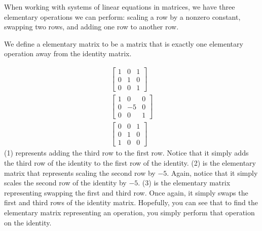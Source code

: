 When working with systems of linear equations in matrices, we have three elementary operations we can perform: scaling a row by a nonzero constant, swapping two rows, and adding one row to another row.
\begin{definition}
    We define a elementary matrix to be a matrix that is exactly one elementary operation away from the identity matrix.
\end{definition}
\begin{example}
    \begin{align*}
        \begin{bmatrix}
            1 & 0 & 1 \\
            0 & 1 & 0 \\
            0 & 0 & 1
        \end{bmatrix}\tag{1}\\
        \begin{bmatrix}
            1 & 0 & 0 \\
            0 & -5 & 0 \\
            0 & 0 & 1
        \end{bmatrix}\tag{2}\\
        \begin{bmatrix}
            0 & 0 & 1\\
            0 & 1 & 0\\
            1 & 0 & 0
        \end{bmatrix}\tag{3}
    \end{align*}
    (1) represents adding the third row to the first row. Notice that it simply adds the third row of the identity to the first row of the identity. (2) is the elementary matrix that represents scaling the second row by $-5$. Again, notice that it simply scales the second row of the identity by $-5$. (3) is the elementary matrix representing swapping the first and third row. Once again, it simply swaps the first and third rows of the identity matrix. Hopefully, you can see that to find the elementary matrix representing an operation, you simply perform that operation on the identity.
\end{example}

